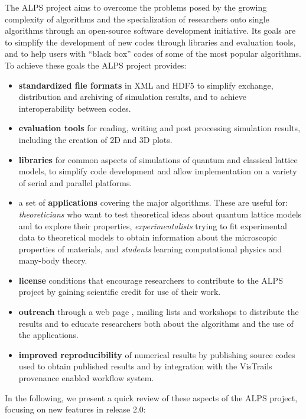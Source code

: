 \documentclass[12pt]{iopart}
\begin{document}
The ALPS project aims to
overcome the problems posed by the growing complexity of algorithms
and the specialization of researchers onto single algorithms through
an open-source software development initiative. Its goals are to simplify the development of new codes through libraries and evaluation tools, and to help users with ``black box'' codes of some of the most popular algorithms. To achieve these goals the ALPS project provides:
\begin{itemize}
\item {\bf standardized file formats} in XML \cite{xml} and HDF5 \cite{hdf5} to simplify exchange,
distribution and archiving of simulation results, and to achieve
interoperability between codes.

\item {\bf evaluation tools} for reading, writing and post processing simulation results, including the creation of 2D and 3D plots.

\item {\bf libraries} for common aspects of
simulations of quantum and classical lattice models, to simplify code
development and allow implementation on a variety of serial and parallel platforms.
\item a set of {\bf applications} covering the major algorithms. These are useful for: 
{\it theoreticians} who want to test theoretical ideas about quantum
lattice models and to explore their properties,  
{\it experimentalists} trying to fit experimental data to theoretical
models to obtain information about the microscopic properties of
materials, and {\it students} learning computational physics and many-body theory.
\item{\bf license} conditions \cite{librarylicense,applicationlicense} that encourage researchers to contribute
to the ALPS project by gaining scientific credit for use of their
work.
\item {\bf outreach} through a web page \cite{alps}, mailing lists and
workshops to distribute the results and to educate researchers both
about the algorithms and the use of the applications.
\item {\bf improved reproducibility} of numerical results by
publishing source codes used to obtain published results and by integration with the VisTrails \cite{vistrails} provenance enabled workflow system.
\end{itemize}



 In the following, we present a quick review of these
 aspects of the ALPS project, focusing on new features in release 2.0:
 
\end{document}
